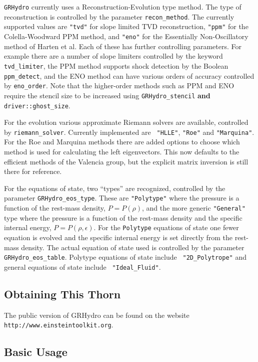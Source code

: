 \documentclass{article}
\begin{document}
{\tt GRHydro} currently uses a Reconstruction-Evolution type method. The type
of reconstruction is controlled by the parameter {\tt recon\_method}.
The currently supported values are {\tt "tvd"} for slope limited TVD
reconstruction, {\tt "ppm"} for the Colella-Woodward PPM method, and
{\tt "eno"} for the Essentially Non-Oscillatory method of Harten et
al. Each of these has further controlling parameters. For example
there are a number of slope limiters controlled by the keyword {\tt
  tvd\_limiter}, the PPM method supports shock detection by the
Boolean {\tt ppm\_detect}, and the ENO method can have various orders
of accuracy controlled by {\tt eno\_order}. Note that the higher-order
methods such as PPM and ENO require the stencil size to be increased
using {\tt GRHydro\_stencil} {\bf and} {\tt driver::ghost\_size}.

For the evolution various approximate Riemann solvers are available,
controlled by {\tt riemann\_solver}. Currently implemented are {\tt
  "HLLE"}, {\tt "Roe"} and {\tt "Marquina"}. For the Roe and Marquina
methods there are added options to choose which method is used for
calculating the left eigenvectors. This now defaults to the efficient
methods of the Valencia group, but the explicit matrix inversion is
still there for reference.

For the equations of state, two ``types'' are recognized, controlled
by the parameter {\tt GRHydro\_eos\_type}. These are {\tt "Polytype"}
where the pressure is a function of the rest-mass density, $P=P(\rho)$, and the
more generic {\tt "General"} type where the pressure is a function
of the rest-mass density and the specific internal energy, $P=P(\rho, \epsilon)$. For the
{\tt Polytype} equations of state one fewer equation is evolved and
the specific internal energy is set directly from the rest-mass density. The
actual equation of state used is controlled by the parameter {\tt
  GRHydro\_eos\_table}. Polytype equations of state include {\tt
  "2D\_Polytrope"} and general equations of state include {\tt
  "Ideal\_Fluid"}. 

\subsection{Obtaining This Thorn}

The public version of GRHydro can be found on the
website {\tt http://www.einsteintoolkit.org}. 

\subsection{Basic Usage}
\end{document}
